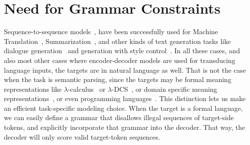 \section{Need for Grammar Constraints}
Sequence-to-sequence models~\citep{sutskever:14}, have been successfully used for Machine
Translation~\citep[among many
others]{sutskever:14,cho2014learning,bahdanau2014neural,wiseman2016sequence,artetxe2017unsupervised},
Summarization~\citep[among others]{Nallapati2016AbstractiveTS,Paulus2017ADR},
and other kinds of text generation tasks like dialogue
generation~\citep[for one]{li2017adversarial} and generation with style
control~\citep[for one]{ficler2017controlling}. In all these cases, and also most
other cases where encoder-decoder models are used for transducing language
inputs, the targets are in natural language as well. That is not the case when
the task is semantic parsing, since the targets may be formal meaning representations
like
$\lambda$-calculus~\citep{Zettlemoyer2005LearningTM,zettlemoyer2007online,kwiatkowski2011lexical}
or
$\lambda$-DCS~\citep{liang2011learning,berant2014semantic,wang2015,pasupat2015compositional},
or domain specific meaning
representations~\citep{dahl1994,Zelle1996LearningTP,kate2005learning}, or even programming
languages~\citep{yin17acl,rabinovich17acl,iyer2017learning,suhr2018learning}.
This distinction
lets us make an efficient task-specific
modeling choice. When the target is a formal language, we can easily define a
grammar that disallows illegal sequences of target-side tokens, and
explicitly incorporate that grammar into the decoder. That way, the decoder will
only score valid target-token sequences.

